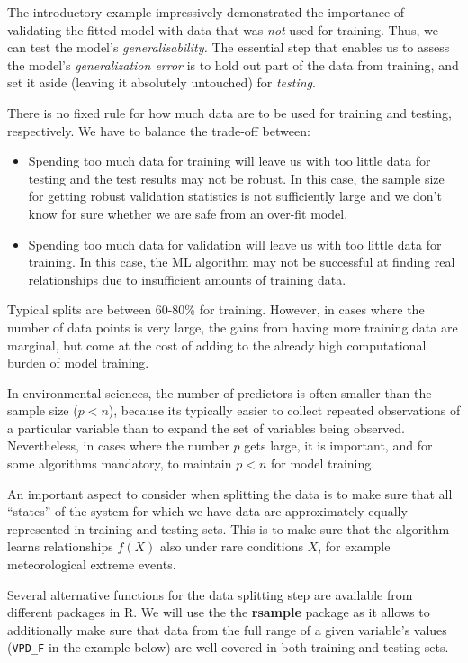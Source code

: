 \documentclass[
]{book}
\providecommand{\tightlist}{%
  \setlength{\itemsep}{0pt}\setlength{\parskip}{0pt}}
\begin{document}
The introductory example impressively demonstrated the importance of validating the fitted model with data that was \emph{not} used for training. Thus, we can test the model's \emph{generalisability.} The essential step that enables us to assess the model's \emph{generalization error} is to hold out part of the data from training, and set it aside (leaving it absolutely untouched) for \emph{testing}.

There is no fixed rule for how much data are to be used for training and testing, respectively. We have to balance the trade-off between:

\begin{itemize}
\tightlist
\item
  Spending too much data for training will leave us with too little data for testing and the test results may not be robust. In this case, the sample size for getting robust validation statistics is not sufficiently large and we don't know for sure whether we are safe from an over-fit model.
\item
  Spending too much data for validation will leave us with too little data for training. In this case, the ML algorithm may not be successful at finding real relationships due to insufficient amounts of training data.
\end{itemize}

Typical splits are between 60-80\% for training. However, in cases where the number of data points is very large, the gains from having more training data are marginal, but come at the cost of adding to the already high computational burden of model training.

In environmental sciences, the number of predictors is often smaller than the sample size (\(p < n\)), because its typically easier to collect repeated observations of a particular variable than to expand the set of variables being observed. Nevertheless, in cases where the number \(p\) gets large, it is important, and for some algorithms mandatory, to maintain \(p < n\) for model training.

An important aspect to consider when splitting the data is to make sure that all ``states'' of the system for which we have data are approximately equally represented in training and testing sets. This is to make sure that the algorithm learns relationships \(f(X)\) also under rare conditions \(X\), for example meteorological extreme events.

Several alternative functions for the data splitting step are available from different packages in R. We will use the the \textbf{rsample} package as it allows to additionally make sure that data from the full range of a given variable's values (\texttt{VPD\_F} in the example below) are well covered in both training and testing sets.
\end{document}
